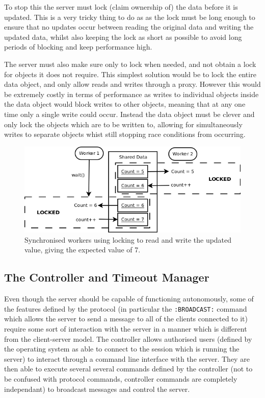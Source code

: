 To stop this the server must lock (claim ownership of) the data before it is updated. This is a very tricky thing to do as as the lock must be long enough to ensure that no updates occur between reading the original data and writing the updated data, whilst also keeping the lock as short as possible to avoid long periods of blocking and keep performance high.


The server must also make sure only to lock when needed, and not obtain a lock for objects it does not require. This simplest solution would be to lock the entire data object, and only allow reads and writes through a proxy. However this would be extremely costly in terms of performance as writes to individual objects inside the data object would block writes to other objects, meaning that at any one time only a single write could occur. Instead the data object must be clever and only lock the objects which are to be written to, allowing for simultaneously writes to separate objects whist still stopping race conditions from occurring.

\begin{figure}[!h]
    \begin{center}
        \includegraphics[scale=0.6]{Design/diagrams/server_locking.png}
        \caption{Synchronised workers using locking to read and write the updated value, giving the expected value of 7.}
        \label{lockingDia}
    \end{center}
\end{figure}

\subsection{The Controller and Timeout Manager}
Even though the server should be capable of functioning autonomously, some of the features defined by the protocol (in particular the \texttt{:BROADCAST:} command which allows the server to send a message to all of the clients connected to it) require some sort of interaction with the server in a manner which is different from the client-server model. The controller allows authorised users (defined by the operating system as able to connect to the session which is running the server) to interact through a command line interface with the server. They are then able to execute several several commands defined by the controller (not to be confused with protocol commands, controller commands are completely independant) to broadcast messages and control the server. 

